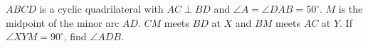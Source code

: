 $ABCD$ is a cyclic quadrilateral with $AC\perp BD$ and $\angle A=\angle DAB=50^\circ$. $M$ is the midpoint of the minor arc $AD$. $CM$ meets $BD$ at $X$ and $BM$ meets $AC$ at $Y$. If $\angle XYM=90^\circ$, find $\angle ADB$.
